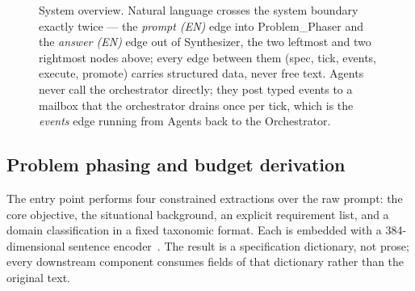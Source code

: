\documentclass[11pt]{article}
\begin{document}
\begin{figure}[t]
\centering
{}
\caption{System overview. Natural language crosses the system boundary exactly
twice --- the \emph{prompt (EN)} edge into Problem\_Phaser and the
\emph{answer (EN)} edge out of Synthesizer, the two leftmost and two
rightmost nodes above; every edge between them (spec, tick, events, execute,
promote) carries structured data, never free text. Agents never call the
orchestrator directly; they post typed events to a mailbox that the
orchestrator drains once per tick, which is the \emph{events} edge running
from Agents back to the Orchestrator.}
\label{fig:overview}
\end{figure}

\subsection{Problem phasing and budget derivation}
\label{sec:phaser}

The entry point performs four constrained extractions over the raw prompt:
the core objective, the situational background, an explicit requirement list,
and a domain classification in a fixed taxonomic format. Each is embedded with
a 384-dimensional sentence encoder~\cite{reimers2019sbert}. The result is a
specification dictionary, not prose; every downstream component consumes fields
of that dictionary rather than the original text.
\end{document}
